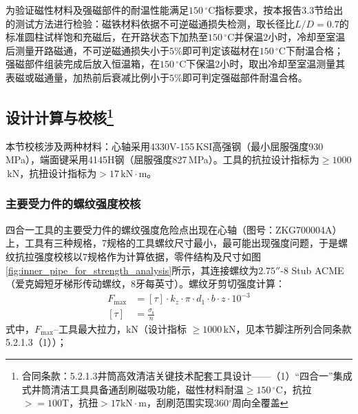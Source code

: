 为验证磁性材料及强磁部件的耐温性能满足$150\,^\circ\mathrm{C}$指标要求，按本报告3.3节给出的测试方法进行检验：磁铁材料依据不可逆磁通损失检测，取长径比$L/D=0.7$的标准圆柱试样饱和充磁后，在开路状态下加热至$150\,^\circ\mathrm{C}$并保温$2$小时，冷却至室温后测量开路磁通，不可逆磁通损失小于$5\%$即可判定该磁材在$150\,^\circ\mathrm{C}$下耐温合格；强磁部件组装完成后放入恒温箱，在$150\,^\circ\mathrm{C}$下保温$2$小时，取出冷却至室温测量其表磁或磁通量，加热前后衰减比例小于$5\%$即可判定强磁部件耐温合格。

\subsection[设计计算与校核]{设计计算与校核\protect\footnote{合同条款：5.2.1.3井筒高效清洁关键技术配套工具设计——（1）“四合一”集成式井筒清洁工具具备通刮刷磁吸功能，磁性材料耐温$\ge 150\,^\circ\mathrm{C}$，抗拉$>=100\mathrm{T}$，抗扭$>17\mathrm{kN}\cdot \mathrm{m}$，刮刷范围实现360$^{\circ}$周向全覆盖}}

本节校核涉及两种材料：心轴采用4330V-155\,KSI高强钢（最小屈服强度930\,MPa），端面键采用4145H钢（屈服强度827\,MPa）。工具的抗拉设计指标为$\geq1000$\,kN，抗扭设计指标为$>17\,\mathrm{kN\cdot m}$。

\subsubsection{主要受力件的螺纹强度校核}
四合一工具的主要受力件的螺纹强度危险点出现在心轴（图号：ZKG700004A）上，工具有三种规格，7\inch 规格的工具螺纹尺寸最小，最可能出现强度问题，于是螺纹抗拉强度校核以7\inch 规格作为计算依据，零件结构及尺寸如图\ref{fig:inner_pipe_for_strength_analysis}所示，其连接螺纹为$2.75''\text{-}8$ Stub ACME（爱克姆短牙梯形传动螺纹，8牙每英寸）。螺纹牙剪切强度计算：
\begin{equation}
\begin{aligned}
    F_{\max} &= [\tau] \cdot k_z \cdot \pi \cdot d_1 \cdot b \cdot z \cdot 10^{-3} \\
    [\tau] &= \frac{\sigma_{\mathrm{s}}}{n}
\end{aligned}
\end{equation}
式中，$F_{\max}$--工具最大拉力，kN（设计指标 $\ge 1000$\,kN，见本节脚注所列合同条款 5.2.1.3（1））；


